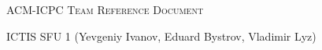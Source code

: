 \documentclass[a4paper]{article}
\begin{document}
\thispagestyle{fancy}

\begin{center}
	\Huge\textsc{ACM-ICPC Team Reference Document}

	\huge ICTIS SFU 1 (Yevgeniy Ivanov, Eduard Bystrov, Vladimir Lyz)

	\vspace{0.50cm}
\end{center}

\begin{multicols*}{2}
    \tableofcontents

    \setcounter{page}{1}
    
\end{multicols*}



%
%	
\end{document}
